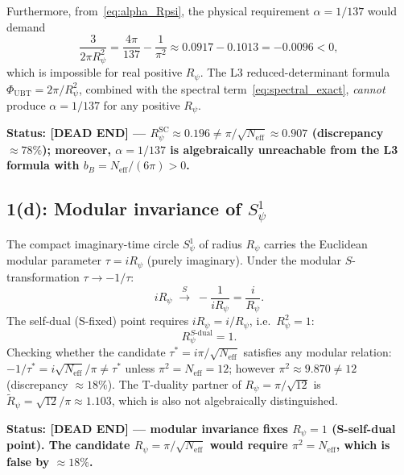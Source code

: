 \documentclass[11pt,a4paper]{article}
\theoremstyle{definition}
\theoremstyle{remark}
\begin{document}
Furthermore, from~\eqref{eq:alpha_Rpsi}, the physical requirement
$\alpha = 1/137$ would demand
\begin{equation}
  \frac{3}{2\pi R_\psi^2}
  = \frac{4\pi}{137} - \frac{1}{\pi^2}
  \approx 0.0917 - 0.1013
  = -0.0096 < 0,
  \label{eq:alpha137_impossible}
\end{equation}
which is impossible for real positive $R_\psi$.
The L3 reduced-determinant formula $\Phi_{\mathrm{UBT}} = 2\pi/R_\psi^2$,
combined with the spectral term~\eqref{eq:spectral_exact},
\emph{cannot} produce $\alpha = 1/137$ for any positive $R_\psi$.

\medskip
\textbf{Status: \textbf{[DEAD END]} ---
$R_\psi^{\mathrm{SC}} \approx 0.196 \neq \pi/\sqrt{N_{\mathrm{eff}}} \approx 0.907$
(discrepancy $\approx 78\%$);
moreover, $\alpha = 1/137$ is algebraically unreachable from the L3
formula with $b_B = N_{\mathrm{eff}}/(6\pi) > 0$.}

\subsection{1(d): Modular invariance of $S^1_\psi$}
\label{subsec:modular_invariance}

The compact imaginary-time circle $S^1_\psi$ of radius $R_\psi$ carries
the Euclidean modular parameter $\tau = iR_\psi$ (purely imaginary).
Under the modular $S$-transformation $\tau \to -1/\tau$:
\begin{equation}
  iR_\psi \;\xrightarrow{\;S\;}\; -\frac{1}{iR_\psi} = \frac{i}{R_\psi}.
  \label{eq:S_transform}
\end{equation}
The self-dual (S-fixed) point requires $iR_\psi = i/R_\psi$, i.e.\
$R_\psi^2 = 1$:
\begin{equation}
  R_\psi^{S\text{-dual}} = 1.
  \label{eq:Sdual}
\end{equation}
Checking whether the candidate $\tau^* = i\pi/\sqrt{N_{\mathrm{eff}}}$
satisfies any modular relation:
$-1/\tau^* = i\sqrt{N_{\mathrm{eff}}}/\pi \neq \tau^*$
unless $\pi^2 = N_{\mathrm{eff}} = 12$;
however $\pi^2 \approx 9.870 \neq 12$ (discrepancy $\approx 18\%$).
The T-duality partner of $R_\psi = \pi/\sqrt{12}$ is
$\tilde{R}_\psi = \sqrt{12}/\pi \approx 1.103$,
which is also not algebraically distinguished.

\medskip
\textbf{Status: \textbf{[DEAD END]} ---
modular invariance fixes $R_\psi = 1$ (S-self-dual point).
The candidate $R_\psi = \pi/\sqrt{N_{\mathrm{eff}}}$ would require
$\pi^2 = N_{\mathrm{eff}}$, which is false by $\approx 18\%$.}
\end{document}
